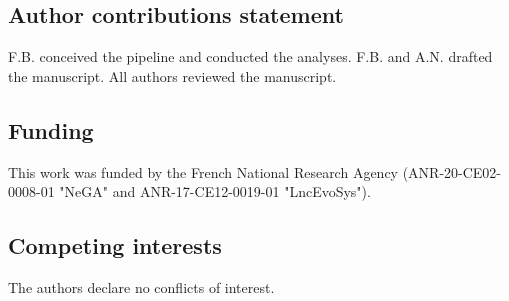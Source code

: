 \subsection*{Author contributions statement}
F.B. conceived the pipeline and conducted the analyses. F.B. and A.N. drafted the manuscript. All authors reviewed the manuscript. 

\subsection*{Funding}
This work was funded by the French National Research Agency (ANR-20-CE02-0008-01 "NeGA" and ANR-17-CE12-0019-01 "LncEvoSys").

\subsection*{Competing interests}
The authors declare no conflicts of interest.
